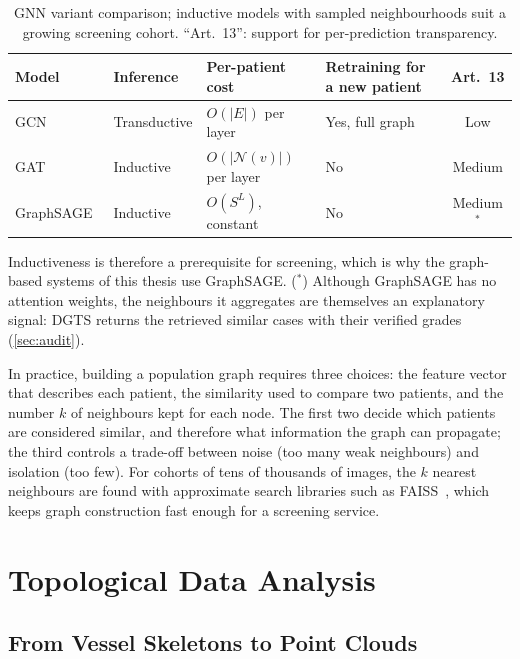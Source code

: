 \begin{table}[!htbp]
\centering
\caption[GNN variant comparison]{GNN variant comparison; inductive models with sampled
neighbourhoods suit a growing screening cohort. ``Art.~13'': support for per-prediction
transparency.}
\label{tab:gnn}
\small
\begin{tabular}{@{}lllP{3.3cm}c@{}}
\toprule
Model & Inference & Per-patient cost & Retraining for a new patient & Art.~13 \\
\midrule
GCN~\cite{kipf2017gcn} & Transductive & $O(|E|)$ per layer & Yes, full graph & Low \\
GAT~\cite{velickovic2018gat} & Inductive & $O(|\mathcal{N}(v)|)$ per layer & No & Medium \\
GraphSAGE~\cite{hamilton2017graphsage} & Inductive & $O(S^L)$, constant & No & Medium$^{\ast}$ \\
\bottomrule
\end{tabular}
\end{table}

Inductiveness is therefore a prerequisite for screening, which is why the graph-based
systems of this thesis use GraphSAGE. ($^{\ast}$) Although GraphSAGE has no attention
weights, the neighbours it aggregates are themselves an explanatory signal: DGTS returns
the retrieved similar cases with their verified grades (\cref{sec:audit}).

In practice, building a population graph requires three choices: the feature vector that
describes each patient, the similarity used to compare two patients, and the number $k$
of neighbours kept for each node. The first two decide which patients are considered
similar, and therefore what information the graph can propagate; the third controls a
trade-off between noise (too many weak neighbours) and isolation (too few). For cohorts of
tens of thousands of images, the $k$ nearest neighbours are found with approximate search
libraries such as FAISS~\cite{johnson2021faiss}, which keeps graph construction fast
enough for a screening service.

\section{Topological Data Analysis}
\label{sec:ph}

\subsection{From Vessel Skeletons to Point Clouds}


